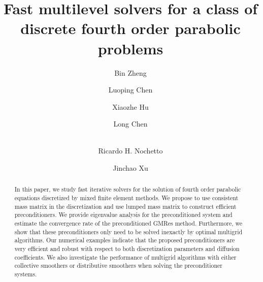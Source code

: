 \documentclass[smallcondensed]{svjour3}
\numberwithin{equation}{section} \numberwithin{table}{section}
\numberwithin{figure}{section}
\numberwithin{algorithm}{section}
\begin{document}
\title{Fast multilevel solvers for a class of discrete fourth order parabolic problems}

\author{Bin Zheng \and Luoping Chen \and Xiaozhe Hu \and Long Chen \and \\ Ricardo H. Nochetto \and Jinchao Xu   }

\maketitle

\begin{abstract}
In this paper, we study fast iterative solvers for the solution of fourth order parabolic equations discretized by mixed finite element methods. We propose to use consistent mass matrix in the discretization and use lumped mass matrix to construct efficient preconditioners. We provide eigenvalue analysis for the preconditioned system and estimate the convergence rate of the preconditioned GMRes method. Furthermore, we show that these preconditioners only need to be solved inexactly by optimal multigrid algorithms. Our numerical examples indicate that the proposed preconditioners are very efficient and robust with respect to both discretization parameters and diffusion coefficients. We also investigate the performance of multigrid algorithms with either collective smoothers or distributive smoothers when solving the preconditioner systems. 
\end{abstract}
\end{document}
